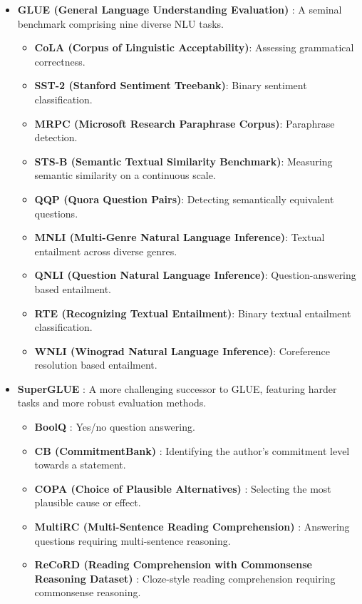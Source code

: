 \begin{itemize}
    \item \textbf{GLUE (General Language Understanding Evaluation)} \cite{wang2018glue}: A seminal benchmark comprising nine diverse NLU tasks.
    \begin{itemize}
        \item \textbf{CoLA (Corpus of Linguistic Acceptability)}: Assessing grammatical correctness.
        \item \textbf{SST-2 (Stanford Sentiment Treebank)}: Binary sentiment classification.
        \item \textbf{MRPC (Microsoft Research Paraphrase Corpus)}: Paraphrase detection.
        \item \textbf{STS-B (Semantic Textual Similarity Benchmark)}: Measuring semantic similarity on a continuous scale.
        \item \textbf{QQP (Quora Question Pairs)}: Detecting semantically equivalent questions.
        \item \textbf{MNLI (Multi-Genre Natural Language Inference)}: Textual entailment across diverse genres.
        \item \textbf{QNLI (Question Natural Language Inference)}: Question-answering based entailment.
        \item \textbf{RTE (Recognizing Textual Entailment)}: Binary textual entailment classification.
        \item \textbf{WNLI (Winograd Natural Language Inference)}: Coreference resolution based entailment.
    \end{itemize}
    \item \textbf{SuperGLUE} \cite{wang2019superglue}: A more challenging successor to GLUE, featuring harder tasks and more robust evaluation methods.
    \begin{itemize}
        \item \textbf{BoolQ} \cite{clark2019boolq}: Yes/no question answering.
        \item \textbf{CB (CommitmentBank)} \cite{de2019commitmentbank}: Identifying the author's commitment level towards a statement.
        \item \textbf{COPA (Choice of Plausible Alternatives)} \cite{roemmele2011choice}: Selecting the most plausible cause or effect.
        \item \textbf{MultiRC (Multi-Sentence Reading Comprehension)} \cite{khashabi2018looking}: Answering questions requiring multi-sentence reasoning.
        \item \textbf{ReCoRD (Reading Comprehension with Commonsense Reasoning Dataset)} \cite{zhang2018record}: Cloze-style reading comprehension requiring commonsense reasoning.

\end{itemize}
\end{itemize}
